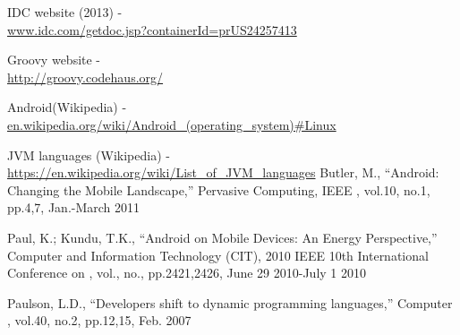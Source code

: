 \documentclass{sig-alternate}
\def \DALVIK{Dalvik\xspace}
\def \ANDROID{Android\xspace}
\def \JVM{JVM\xspace}
\begin{document}
\begin{thebibliography}{}

  IDC website (2013) - \\ \url{www.idc.com/getdoc.jsp?containerId=prUS24257413}

  Groovy website - \\ \url{http://groovy.codehaus.org/}
  
  \ANDROID (Wikipedia) - \\ \url{en.wikipedia.org/wiki/Android\_(operating\_system)#Linux}

  \JVM languages (Wikipedia) - \\ \url{https://en.wikipedia.org/wiki/List\_of\_JVM\_languages}
   Butler, M., ``Android: Changing the Mobile Landscape,'' Pervasive Computing, IEEE , vol.10, no.1, pp.4,7, Jan.-March 2011

  Paul, K.; Kundu, T.K., ``Android on Mobile Devices: An Energy Perspective,'' Computer and Information Technology (CIT), 2010 IEEE 10th International Conference on , vol., no., pp.2421,2426, June 29 2010-July 1 2010

  Paulson, L.D., ``Developers shift to dynamic programming languages,'' Computer , vol.40, no.2, pp.12,15, Feb. 2007


\end{thebibliography}
\end{document}
